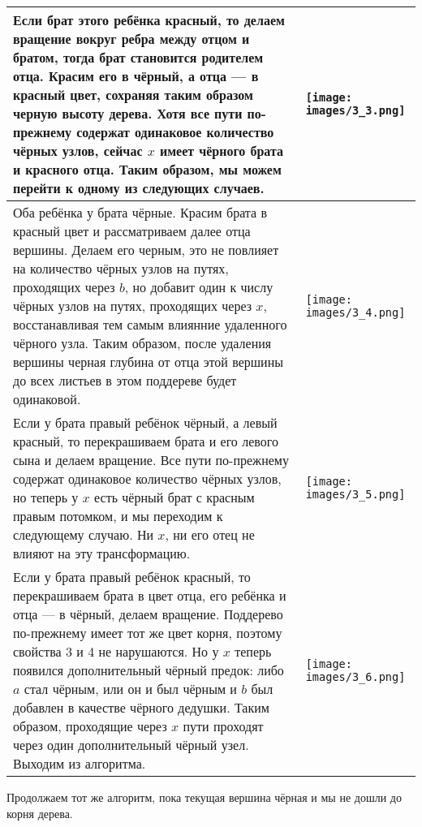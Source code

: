 \begin{center}
\begin{tabular}{|m{10cm}|m{7cm}|}
\hline
Если брат этого ребёнка красный, то делаем вращение вокруг ребра между отцом и братом, тогда брат становится родителем отца. Красим его в чёрный, а отца — в красный цвет, сохраняя таким образом черную высоту дерева.
Хотя все пути по-прежнему содержат одинаковое количество чёрных узлов, сейчас $x$ имеет чёрного брата и красного отца.
Таким образом, мы можем перейти к одному из следующих случаев.
& \texttt{[image: images/3\_3.png]} \\ \hline
Оба ребёнка у брата чёрные.
Красим брата в красный цвет и рассматриваем далее отца вершины.
Делаем его черным, это не повлияет на количество чёрных узлов на путях, проходящих через $b$, но добавит один к числу чёрных узлов на путях, проходящих через $x$, восстанавливая тем самым влиянние удаленного чёрного узла.
Таким образом, после удаления вершины черная глубина от отца этой вершины до всех листьев в этом поддереве будет одинаковой. 
& \texttt{[image: images/3\_4.png]} \\ \hline
Если у брата правый ребёнок чёрный, а левый красный, то перекрашиваем брата и его левого сына и делаем вращение.
Все пути по-прежнему содержат одинаковое количество чёрных узлов, но теперь у $x$ есть чёрный брат с красным правым потомком, и мы переходим к следующему случаю.
Ни $x$, ни его отец не влияют на эту трансформацию.
& \texttt{[image: images/3\_5.png]} \\ \hline
Если у брата правый ребёнок красный, то перекрашиваем брата в цвет отца, его ребёнка и отца — в чёрный, делаем вращение.
Поддерево по-прежнему имеет тот же цвет корня, поэтому свойства 3 и 4 не нарушаются.
Но у $x$ теперь появился дополнительный чёрный предок: либо $a$ стал чёрным, или он и был чёрным и $b$ был добавлен в качестве чёрного дедушки.
Таким образом, проходящие через $x$ пути проходят через один дополнительный чёрный узел.
Выходим из алгоритма. 
& \texttt{[image: images/3\_6.png]} \\ \hline

\end{tabular}
\end{center}

Продолжаем тот же алгоритм, пока текущая вершина чёрная и мы не дошли до корня дерева.
